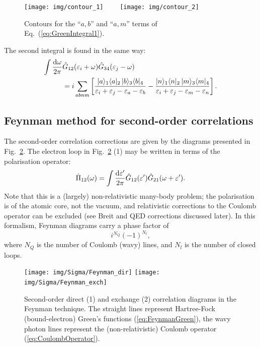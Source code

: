 \documentclass[10pt,twocolumn,a4paper]{article}%
\newcommand{\bra}[1]{\ensuremath{\langle #1|}}	%
\newcommand{\ket}[1]{\ensuremath{|#1\rangle}}	%
\newcommand{\be}{\begin{equation}}
\newcommand{\ee}{\end{equation}}
\def\d{\ensuremath{{\rm d}}}
\def\en{\ensuremath{\varepsilon}}
\newcommand{\w}{\ensuremath{\omega}}
\begin{document}
\begin{figure}%
\centering
\texttt{[image: img/contour\_1]}~~~~
\texttt{[image: img/contour\_2]}
\caption{\small Contours for the ``$a,b$'' and ``$a,m$'' terms of Eq.~(\ref{eq:GreenIntegral1}).\label{fig:contour}}
\end{figure}

The second integral is found in the same way:
\begin{align}
\int \frac{\d \w}{2\pi}&\hat G_{12}(\en_i+\w) \hat G_{34}(\en_j - \omega)\notag\\
&=
i\sum_{abnm}\left[
\frac{\ket{a}_1\bra{a}_2 \, \ket{b}_3\bra{b}_4}{\en_i+\en_j - \en_a - \en_b}
-
\frac{\ket{n}_1\bra{n}_2 \, \ket{m}_3\bra{m}_4}{\en_i + \en_j - \en_m - \en_n}
\right].
\label{eq:GreenInt2}
\end{align}



\subsection{Feynman method for second-order correlations}



The second-order correlation corrections are given by the diagrams presented in Fig.~\ref{fig:Sigma2-Feyn}.
The electron loop in Fig.~\ref{fig:Sigma2-Feyn} (1) may be written in terms of the polarisation operator:
\be\label{eq:PolarisationOperator}
\hat\Pi_{12}(\w) = \int \frac{\d \en'}{2\pi}\hat  G_{12}(\en') \hat G_{21}(\w+\en') .
\ee
Note that this is a (largely) non-relativistic many-body problem; the polarisation is of the atomic core, not the vacuum, and relativistic corrections to the Coulomb operator can be excluded (see Breit and QED corrections discussed later).
In this formalism, Feynman diagrams carry a phase factor of
\be\label{eq:phaseFactor}
i^{N_{Q}}(-1)^{N_{l}},
\ee
where $N_{Q}$ is the number of Coulomb (wavy) lines, and $N_{l}$ is the number of closed loops.


\begin{figure}%
\centering
\texttt{[image: img/Sigma/Feynman\_dir]}
\texttt{[image: img/Sigma/Feynman\_exch]}
\caption{\label{fig:Sigma2-Feyn}\small Second-order direct (1) and exchange (2) correlation diagrams in the Feynman technique.
The straight lines represent Hartree-Fock (bound-electron) Green's functions (\ref{eq:FeynmanGreen}),
the wavy photon lines represent the (non-relativistic) Coulomb operator (\ref{eq:CoulombOperator}).
}
\end{figure}
\end{document}
